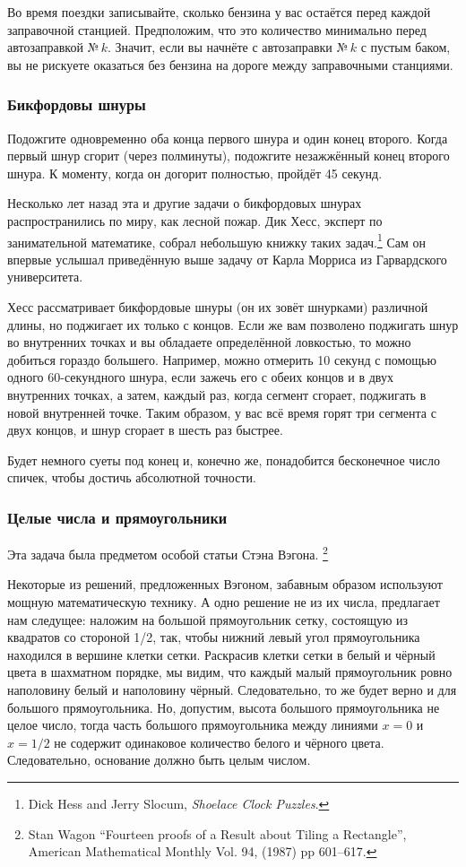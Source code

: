 Во время поездки записывайте, сколько бензина у вас остаётся перед каждой заправочной станцией.
Предположим, что это количество минимально перед автозаправкой №\,$k$.
Значит, если вы начнёте с автозаправки №\,$k$ с пустым баком, вы не рискуете оказаться без бензина на дороге между заправочными станциями.\heart

\subsubsection*{Бикфордовы шнуры} %

Подожгите одновременно оба конца первого шнура и один конец второго.
Когда первый шнур сгорит (через полминуты), подожгите незажжённый конец второго шнура.
К моменту, когда он догорит полностью, пройдёт 45 секунд.
\heart

Несколько лет назад эта и другие задачи о бикфордовых шнурах распространились по миру, как лесной пожар.
Дик Хесс, эксперт по занимательной математике, 
собрал небольшую книжку таких задач.\footnote{Dick Hess and Jerry Slocum, \emph{Shoelace Clock Puzzles}.}
Сам он впервые услышал приведённую выше задачу от Карла Морриса из Гарвардского университета.

Хесс рассматривает бикфордовые шнуры (он их зовёт шнурками) различной длины, но поджигает их только с концов.
Если же вам позволено поджигать шнур во внутренних точках и вы обладаете определённой ловкостью, то можно добиться гораздо большего.
Например, можно отмерить 10 секунд с помощью одного 60-секундного шнура, если зажечь его с обеих концов и в двух внутренних точках, а затем, каждый раз, когда сегмент сгорает, поджигать в новой внутренней точке.
Таким образом, у вас всё время горят три сегмента с двух концов, и шнур сгорает в шесть раз быстрее.

Будет немного суеты под конец и, конечно же, понадобится бесконечное число спичек, чтобы достичь абсолютной точности.

\subsubsection*{Целые числа и прямоугольники} %

Эта задача была предметом особой 
статьи Стэна Вэгона.%
\footnote{Stan Wagon “Fourteen proofs of a Result about Tiling a Rectangle”, American Mathematical Monthly Vol. 94, (1987) pp 601--617.}

Некоторые из решений, предложенных Вэгоном, забавным образом используют мощную математическую технику.
А одно решение не из их числа, предлагает нам следущее:
наложим на большой прямоугольник сетку, состоящую из квадратов со стороной 1/2, так, чтобы нижний левый угол прямоугольника находился в вершине клетки сетки.
Раскрасив клетки сетки в белый и чёрный цвета в шахматном порядке, 
мы видим, что каждый малый прямоугольник ровно наполовину белый и наполовину чёрный.
Следовательно, то же будет верно и для большого прямоугольника.
Но, допустим, высота большого прямоугольника не целое число, тогда часть 
большого прямоугольника между линиями $x=0$ и $x=1/2$ не содержит одинаковое количество белого и чёрного цвета.
Следовательно, основание должно быть целым числом.\heart

